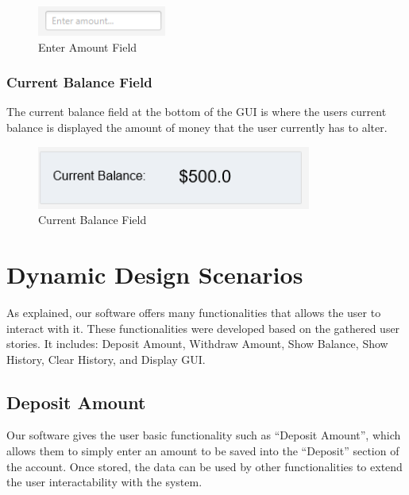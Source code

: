 \documentclass[12pt]{article}
\begin{document}
\begin{figure}[h!]
  \centering
  \includegraphics[]{enter_amount.png}
  \caption{Enter Amount Field}
\end{figure}

\subsubsection{Current Balance Field}
The current balance field at the bottom of the GUI is where the users current balance is displayed the amount of money that the user currently has to alter.

\begin{figure}[h!]
  \centering
  \includegraphics[]{current_balance.png}
  \caption{Current Balance Field}
\end{figure}


\section{Dynamic Design Scenarios}
As explained, our software offers many functionalities that allows the user to interact with it. These functionalities were developed based on the gathered user stories. It includes: Deposit Amount, Withdraw Amount, Show Balance, Show History, Clear History, and Display GUI. 

\subsection{Deposit Amount}
Our software gives the user basic functionality such as “Deposit Amount”, which allows them to simply enter an amount to be saved into the “Deposit” section of the account. Once stored, the data can be used by other functionalities to extend the user interactability with the system. 
\end{document}
